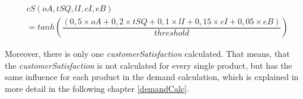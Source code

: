 \begin{equation}
\begin{aligned}
\label{cSCalc}
    & cS(oA, tSQ, lI, cI, eB) \\
    & = tanh(\dfrac{(0,5 \times oA + 0,2 \times tSQ + 0,1 \times lI + 0,15 \times cI + 0,05 \times eB)}{threshold}) %
\end{aligned}    
\end{equation}

Moreover, there is only one \textit{customerSatisfaction} calculated. That means, that the \textit{customerSatisfaction} is not calculated for every single product, but has the same influence for each product in the demand calculation, which is explained in more detail in the following chapter \ref{demandCalc}.

\begin{comment}
Moreover, there are three main levels of customer requirements regarding products: Must haves, satisfiers and delighters. \cite{krienke_messung_2009}
Must haves are the bare minimum requirements expected of customers. The customers do not show exceptional appreciation for the must haves, but if they are not met, the customer will show dissatisfaction. Satisfiers are the requirements that the customer expressly wishes. If you offer better or more of these satisfiers, then the customers will appreciate it more and be more satisfied. Delighters are the extras or the add-ons. The lack of these characteristics will not make the customer dissatisfied but adding these would greatly increase the customer's satisfaction. In our game, these three levels of customer requirements are included by the following calculation of the customer satisfaction, which depends on a product's \textit{totalProductQuality}. This means, if the user chooses newer, better components for producing a product, then the product's \textit{totalProductQuality} will increase, which again influences the calculation of the customer satisfaction.
    \begin{equation}
    \label{cS_Calc}
    \begin{aligned}
    If \; tPQ \leq \ 40: (0,6*tPQ + 0,15*tSQ + 0,1*lI + 0,1*cI + 0,05*eB)\\
    ElseIf \; tPQ \leq \ 60: (0,5*tPQ + 0,2*tSQ + 0,1*lI + 0,15*cI + 0,05*eB)\\
    Else: (0,45*tPQ + 0,25*tSQ + 0,1*lI + 0,15*cI + 0,05*eB)
    \end{aligned}
    \end{equation}
Each line of the calculation \ref{cS_Calc} refers to one of the three main levels of customer requirements. So, the first line of the calculation refers to a product's must haves, the second line refers to satisfiers and the third line refers to the delighters level of the customer requirements.
Although the calculation \ref{cS_Calc} looks quite static, this is not the case as the variables, on which the calculation is based, are not static but change continuously.
\end{comment}
    
